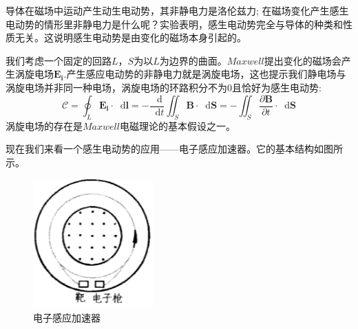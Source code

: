 \documentclass[12pt,a4paper,oneside]{report}
\theoremstyle{definition}
\theoremstyle{remark}
\renewcommand{\d}{\mathop{}\!\mathrm{d}}
\begin{document}
导体在磁场中运动产生动生电动势，其非静电力是洛伦兹力; 在磁场变化产生感生电动势的情形里非静电力是什么呢？实验表明，感生电动势完全与导体的种类和性质无关。这说明感生电动势是由变化的磁场本身引起的。

我们考虑一个固定的回路$L$，$S$为以$L$为边界的曲面。$Maxwell$提出变化的磁场会产生涡旋电场$\mathbf{E_i}$.产生感应电动势的非静电力就是涡旋电场，这也提示我们静电场与涡旋电场并非同一种电场，涡旋电场的环路积分不为$0$且恰好为感生电动势:
\[
\mathscr C = \oint_L \mathbf{E_i} \cdot  \d \mathbf{l} = -\frac{\d}{\d t} \iint_S \mathbf{B}\cdot \d \mathbf{S} = -\iint_S \frac{\partial \mathbf{B}}{\partial t}\cdot \d \mathbf{S}
\]
涡旋电场的存在是$Maxwell$电磁理论的基本假设之一。

现在我们来看一个感生电动势的应用——电子感应加速器。它的基本结构如图所示。

\begin{figure}[h]
  \centering
  \begin{minipage}[t]{0.3\textwidth}
    \centering
    \includegraphics[width=\textwidth]{4-2.png}
    \caption{电子感应加速器}
  \end{minipage}
  \hfill
  \begin{minipage}[t]{0.3\textwidth}
    \centering

\end{minipage}
\end{figure}
\end{document}
